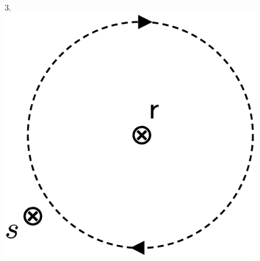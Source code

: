 \begin{figure}[b!]
3.\includegraphics[scale=0.2]{graphics/orientations_parallel.eps}
\vspace*{20pt}
\end{figure}
